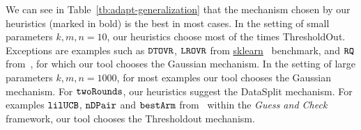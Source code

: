 We can see in Table~\ref{tb:adapt-generalization} that the mechanism
chosen by our heuristics (marked in bold) is the best in most cases.
In the setting of small parameters $k,m,n=10$, our heuristics
choose most of the times ThresholdOut. Exceptions are examples such as $\mathtt{DTOVR}$,
$\mathtt{LROVR}$
from \hyperlink{https://github.com/scikit-learn/scikit-learn/tree/main/examples}{sklearn}~\cite{SklearnBenchmark}
benchmark, and $\mathtt{RQ}$ from~\cite{Jamieson2015TheAO}, for which our tool
chooses the Gaussian mechanism.  In the setting of large parameters
$k,m,n=1000$, 
for most examples our tool chooses the Gaussian mechanism.
For $\mathtt{twoRounds}$, our heuristics suggest the DataSplit mechanism. For examples $\mathtt{lilUCB}$,
$\mathtt{nDPair}$ and $\mathtt{bestArm}$ from~\cite{Jamieson2015TheAO} within
the \emph{Guess and Check}~\cite{RogersRSSTW20} framework, our tool chooses the Thresholdout mechanism.




